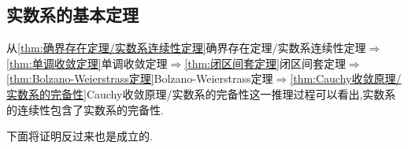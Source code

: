 \subsection{实数系的基本定理}
\begin{red}
    \begin{remark}
        从\cref{thm:确界存在定理/实数系连续性定理}确界存在定理/实数系连续性定理$\Longrightarrow$\cref{thm:单调收敛定理}单调收敛定理$\Longrightarrow$\cref{thm:闭区间套定理}闭区间套定理$\Longrightarrow$\cref{thm:Bolzano-Weierstrass定理}\textup{Bolzano-Weierstrass}定理$\Longrightarrow$\cref{thm:Cauchy收敛原理/实数系的完备性}\textup{Cauchy}收敛原理/实数系的完备性这一推理过程可以看出,实数系的连续性包含了实数系的完备性.

        下面将证明反过来也是成立的.
    \end{remark}
\end{red}
